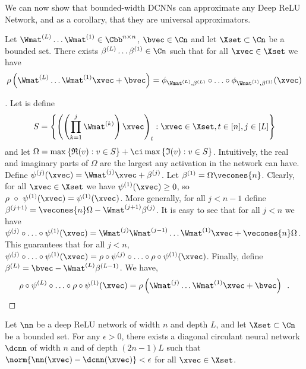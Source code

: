 \noindent
We can now show that bounded-width DCNNs can approximate any Deep ReLU Network, and as a corollary, that they are universal approximators.

\begin{lemma}
  Let $\Wmat^{(L)} \ldots \Wmat^{(1)} \in \Cbb^{n\times n}$, $\bvec \in \Cn$ and let $\Xset \subset \Cn$ be a bounded set.
  There exists $\beta^{(L)} \ldots \beta^{(1)} \in \Cn$ such that for all $\xvec \in \Xset$ we have 
  \begin{equation}
    \rho\left(\Wmat^{(L)} \ldots \Wmat^{(1)}\xvec + \bvec \right) = \phi_{\Wmat^{(L)},\beta^{(L)}} \circ \ldots \circ \phi_{\Wmat^{(1)},\beta^{(1)}}(\xvec)
  \end{equation}
  \label{lemma:product_of_mat_to_DNN}
\end{lemma}

\begin{proof}[]
  Let is define
  \begin{equation}
    S = \left\{ \left(\left(\prod_{k=1}^{j} \Wmat^{(k)} \right) \xvec \right)_{t}: \xvec \in \Xset, t \in [n], j \in [L] \right\}
  \end{equation}
  and let $\Omega = \max\left\{ \mathfrak{R}(v): v \in S \right\} + \ci \max\left\{ \mathfrak{I}(v):v \in S \right\}$.
  Intuitively, the real and imaginary parts of $\Omega$ are the largest any activation in the network can have.
  Define $\psi^{(j)}(\xvec) = \Wmat^{(j)} \xvec + \beta^{(j)}$. Let $\beta^{(1)} = \Omega \vecones{n}$.
  Clearly, for all $\xvec \in \Xset$ we have $\psi^{(1)}(\xvec) \ge 0$, so $\rho\ \circ\ \psi^{(1)}(\xvec) = \psi^{(1)}(\xvec)$.
  More generally, for all $j < n-1$ define $\beta^{(j+1)} = \vecones{n} \Omega - \Wmat^{(j+1)} \beta^{(j)}$.
  It is easy to see that for all $j < n$ we have $\psi^{(j)} \circ \ldots \circ \psi^{(1)}(\xvec) = \Wmat^{(j)} \Wmat^{(j-1)} \ldots \Wmat^{(1)} \xvec + \vecones{n} \Omega$.
  This guarantees that for all $j < n$, $\psi^{(j)} \circ \ldots \circ \psi^{(1)}(\xvec) = \rho \circ \psi^{(j)} \circ \ldots \circ \rho  \circ \psi^{(1)}(\xvec)$.
  Finally, define $\beta^{(L)} = \bvec - \Wmat^{(L)} \beta^{(L-1)}$.
  We have,
  \begin{equation}
    \rho \circ \psi^{(L)} \circ \ldots \circ \rho \circ \psi^{(1)}(\xvec) = \rho \left(\Wmat^{(j)} \ldots \Wmat^{(1)} \xvec + \bvec \right) \enspace.
  \end{equation}
\end{proof}


\begin{lemma} \label{lemma:dcnn_approx_neural_network}
  Let $\nn$ be a deep ReLU network of width $n$ and depth $L$, and let $\Xset \subset \Cn$ be a bounded set.
  For any $\epsilon > 0$, there exists a diagonal circulant neural network $\dcnn$ of width $n$ and of depth $(2n-1)L$ such that $\norm{\nn(\xvec) - \dcnn(\xvec)} < \epsilon$ for all $\xvec \in \Xset$.
\end{lemma}

